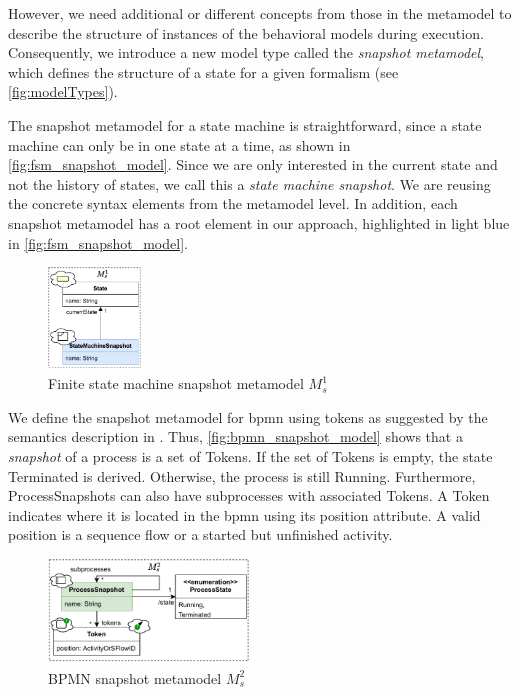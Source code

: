 \documentclass{jot}
\begin{document}
However, we need additional or different concepts from those in the metamodel to describe the structure of instances of the behavioral models during execution.
Consequently, we introduce a new model type called the \emph{snapshot metamodel}, which defines the structure of a state for a given formalism (see \autoref{fig:modelTypes}).

The snapshot metamodel for a state machine is straightforward, since a state machine can only be in one state at a time, as shown in \autoref{fig:fsm_snapshot_model}.
Since we are only interested in the current state and not the history of states, we call this a \emph{state machine snapshot}.
We are reusing the concrete syntax elements from the metamodel level.
In addition, each snapshot metamodel has a root element in our approach, highlighted in light blue in \autoref{fig:fsm_snapshot_model}.
\begin{figure}[h]
    \centering
    \includegraphics[width=0.22\textwidth]{figures/state_machine_s_model.pdf}
    \caption{Finite state machine snapshot metamodel $M_s^1$}
    \label{fig:fsm_snapshot_model}
\end{figure}

We define the snapshot metamodel for \gls*{bpmn} using tokens as suggested by the semantics description in \cite{objectmanagementgroupBusinessProcessModel2013}.
Thus, \autoref{fig:bpmn_snapshot_model} shows that a \emph{snapshot} of a process is a set of \textsf{Token}s.
If the set of \textsf{Token}s is empty, the state \textsf{Terminated} is derived.
Otherwise, the process is still \textsf{Running}.
Furthermore, \textsf{ProcessSnapshot}s can also have \textsf{subprocesses} with associated \textsf{Token}s.
A \textsf{Token} indicates where it is located in the \gls*{bpmn} using its \textsf{position} attribute.
A valid \textsf{position} is a sequence flow or a started but unfinished activity.

\begin{figure}[h]
    \centering
    \includegraphics[width=0.475\textwidth]{figures/bpmn_s_model.pdf}
    \caption{BPMN snapshot metamodel $M_s^2$}
    \label{fig:bpmn_snapshot_model}
\end{figure}
\end{document}
